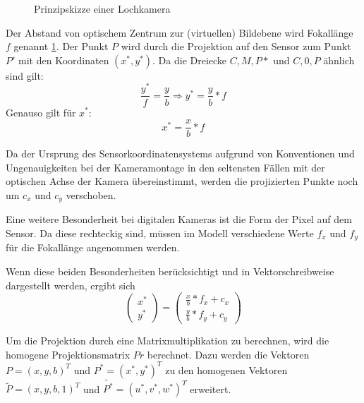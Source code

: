 \begin{figure}[htpb]
  \centering
  \def\svgwidth{\textwidth}
  
  \caption{Prinzipskizze einer Lochkamera }
  \label{fig:Lochkamera}
\end{figure}


Der Abstand von optischem Zentrum zur (virtuellen) Bildebene wird Fokallänge
$f$ genannt \ref{fig:Lochkamera}. Der Punkt $P$ wird durch die Projektion auf
den Sensor zum Punkt $P'$ mit den Koordinaten $(x^*,y^*)$. Da die Dreiecke
$C,M,P*$ und $C,0,P$ ähnlich sind gilt: \begin{equation}
  \frac{y^*}{f}=\frac{y}{b} \Rightarrow y^*=\frac{y}{b}*f \end{equation}
Genauso gilt für $x^*$: \begin{equation} x^*=\frac{x}{b}*f \end{equation}

Da der Ursprung des Sensorkoordinatensystems aufgrund von Konventionen und
Ungenauigkeiten bei der Kameramontage in den seltensten Fällen mit der
optischen Achse der Kamera übereinstimmt, werden die projizierten Punkte noch um
$c_x$ und $c_y$ verschoben.

Eine weitere Besonderheit bei digitalen Kameras ist die Form der Pixel auf dem
Sensor. Da diese rechteckig sind, müssen im Modell verschiedene Werte $f_x$ und
$f_y$ für die Fokallänge angenommen werden.\cite{Bradski2008}

Wenn diese beiden Besonderheiten berücksichtigt und in
Vektorschreibweise dargestellt werden, ergibt sich \begin{equation}
  \begin{pmatrix} x^*\\y^* \end{pmatrix} = \begin{pmatrix} \frac{x}{b}*f_x+c_x
    \\ \frac{y}{b}*f_y+c_y \end{pmatrix} \end{equation}


Um die Projektion durch eine Matrixmultiplikation zu berechnen, wird die
homogene Projektionsmatrix $Pr$ berechnet. Dazu werden die Vektoren
$P=\left(x,y,b\right)^T$ und $P^*=\left(x^*,y^*\right)^T$ zu den homogenen
Vektoren $\tilde{P}=\left(x,y,b,1\right)^T$ und
$\tilde{P^*}=\left(u^*,v^*,w^*\right)^T$ erweitert.

